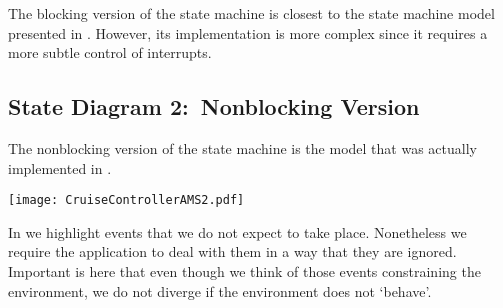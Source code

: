 \documentclass{article}
\begin{document}
\nid The blocking version of the state machine is closest to the state machine model presented in \cite{Wel04}. However, its implementation is more complex since it requires a more subtle control of interrupts.

\subsection{State Diagram 2:~Nonblocking Version}
\label{apx:asm2}

The nonblocking version of the state machine is the model that was actually implemented in \cite{Wel04}.
%
\begin{center}
\vspace{1ex}
\texttt{[image: CruiseControllerAMS2.pdf]}
\end{center}
%
\nid In  we highlight events that we do not expect to take place. Nonetheless we require the application to deal with them in a way that they are ignored. Important is here that even though we think of those events constraining the environment, we do not diverge if the environment does not `behave'.
\end{document}
